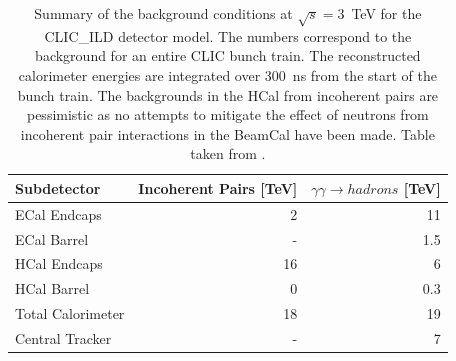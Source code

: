 \begin{table}[h!]
\centering
\begin{tabular}{ l r r }
\hline
Subdetector & Incoherent Pairs [TeV] & $\gamma\gamma \rightarrow hadrons$ [TeV] \\ 
\hline
ECal Endcaps & 2 & 11 \\
ECal Barrel & - & 1.5 \\
HCal Endcaps & 16 & 6 \\
HCal Barrel & 0 & 0.3 \\
\hline
Total Calorimeter & 18 & 19 \\
\hline
Central Tracker & - & 7 \\ 
\hline
\end{tabular}
\caption[Summary of the background conditions at $\sqrt{s}=3$~TeV for the CLIC\_ILD detector model.  The numbers correspond to the background for an entire CLIC bunch train, i.e. 312 bunch crossings separated by a 0.5~ns gap.  The reconstructed calorimeter energies are integrated over 300~ns from the start of the bunch train. The backgrounds in the HCal from incoherent pairs are pessimistic as no attempts to mitigate the effect of neutrons from incoherent pair interactions in the BeamCal have been made.  {Table} taken from \cite{Linssen:2012hp}.]{Summary of the background conditions at $\sqrt{s}=3$~TeV for the CLIC\_ILD detector model.  The numbers correspond to the background for an entire CLIC bunch train.  The reconstructed calorimeter energies are integrated over 300~ns from the start of the bunch train. The backgrounds in the HCal from incoherent pairs are pessimistic as no attempts to mitigate the effect of neutrons from incoherent pair interactions in the BeamCal have been made.  {Table} taken from \cite{Linssen:2012hp}.}
\label{table:clicbkgsummary}
\end{table}


